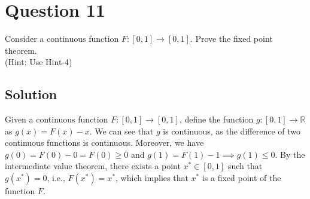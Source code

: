 \section*{Question 11}\label{sec:q11}

Consider a continuous function \( F: [0,1] \rightarrow [0,1] \).
Prove the fixed point theorem. \\
(Hint: Use Hint-4)

\subsection*{Solution}

Given a continuous function \( F: [0,1] \rightarrow [0,1] \), define the function \( g: [0,1] \rightarrow \mathbb{R} \) as \( g(x) = F(x) - x \).
We can see that \( g \) is continuous, as the difference of two continuous functions is continuous.
Moreover, we have \( g(0) = F(0) - 0 = F(0) \geq 0 \) and \( g(1) = F(1) - 1 \implies g(1) \leq 0 \).
By the intermediate value theorem, there exists a point \( x^* \in [0,1] \) such that \( g(x^*) = 0 \), i.e., \( F(x^*) = x^* \), which implies that \( x^* \) is a fixed point of the function \( F \).
